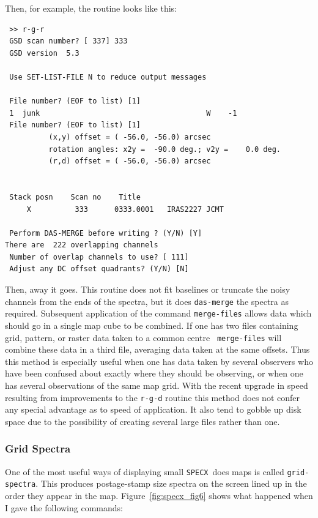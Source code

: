 \documentclass[11pt,twoside]{article}
\newcommand{\SPECX}{{\tt SPECX}}
\begin{document}
Then, for example, the routine looks like this:

\begin{verbatim} >> r-g-r
 GSD scan number? [ 337] 333
 GSD version  5.3

 Use SET-LIST-FILE N to reduce output messages

 File number? (EOF to list) [1]
 1  junk                                      W    -1
 File number? (EOF to list) [1]
          (x,y) offset = ( -56.0, -56.0) arcsec
          rotation angles: x2y =  -90.0 deg.; v2y =    0.0 deg.
          (r,d) offset = ( -56.0, -56.0) arcsec


 Stack posn    Scan no    Title
     X          333      0333.0001   IRAS2227 JCMT

 Perform DAS-MERGE before writing ? (Y/N) [Y]
There are  222 overlapping channels
 Number of overlap channels to use? [ 111]
 Adjust any DC offset quadrants? (Y/N) [N]

\end{verbatim}

Then, away it goes. This routine does not fit baselines or truncate
the noisy channels from the ends of the spectra, but it
does {\tt das-merge} the spectra as required. Subsequent application
of the command {\tt merge-files} allows data which should go in a
single map cube to be combined. If one has two files containing
grid, pattern, or raster data taken to a common centre {\tt
merge-files} will combine these data in a third file, averaging data
taken at the same offsets. Thus this method is especially useful when
one has data taken by several observers who have been confused about
exactly where they should be observing, or when one has several
observations of the same map grid. With the recent upgrade in speed
resulting from improvements to the {\tt r-g-d} routine this method
does not confer any special advantage as to speed of application. It
also tend to gobble up disk space due to the possibility of creating
several large files rather than one.

\subsubsection{Grid Spectra}
\label{sec:specx_13.3}
One of the most useful ways of displaying small \SPECX\ does maps is
called {\tt grid-spectra}. This produces postage-stamp size spectra on
the screen lined up in the order they appear in the map.
Figure~\ref{fig:specx_fig6} shows what happened when I gave the
following commands:
\end{document}
